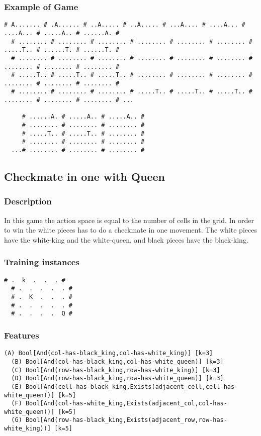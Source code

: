 \documentclass[a4paper]{article}
\begin{document}
\subsubsection{Example of Game}
\begin{Verbatim}[fontsize=\footnotesize]
  # A....... # .A...... # ..A..... # ..A..... # ...A.... # ....A... # ....A... # .....A.. # ......A. #
  # ........ # ........ # ........ # ........ # ........ # ........ # .....T.. # ......T. # ......T. #
  # ........ # ........ # ........ # ........ # ........ # ........ # ........ # ........ # ........ #
  # .....T.. # .....T.. # .....T.. # ........ # ........ # ........ # ........ # ........ # ........ #
  # ........ # ........ # ........ # .....T.. # .....T.. # .....T.. # ........ # ........ # ........ # ...

     # ......A. # .....A.. # .....A.. #
     # ........ # ........ # ........ #
     # .....T.. # .....T.. # ........ #
     # ........ # ........ # ........ #
  ...# ........ # ........ # ........ #

\end{Verbatim}


\subsection{Checkmate in one with Queen}
\subsubsection{Description}
In this game the action space is equal to the number of cells in the grid. In order to win the white pieces has to do a checkmate in one movement. The white pieces have the white-king and the white-queen, and black pieces have the black-king.

\subsubsection{Training instances}
\begin{Verbatim}[fontsize=\footnotesize]
  # .  k  .  .  . #
  # .  .  .  .  . #
  # .  K  .  .  . #
  # .  .  .  .  . #
  # .  .  .  .  Q #
\end{Verbatim}


\subsubsection{Features}
\begin{Verbatim}[fontsize=\footnotesize]
  (A) Bool[And(col-has-black_king,col-has-white_king)] [k=3]
  (B) Bool[And(col-has-black_king,col-has-white_queen)] [k=3]
  (C) Bool[And(row-has-black_king,row-has-white_king)] [k=3]
  (D) Bool[And(row-has-black_king,row-has-white_queen)] [k=3]
  (E) Bool[And(cell-has-black_king,Exists(adjacent_cell,cell-has-white_queen))] [k=5]
  (F) Bool[And(col-has-white_king,Exists(adjacent_col,col-has-white_queen))] [k=5]
  (G) Bool[And(row-has-black_king,Exists(adjacent_row,row-has-white_king))] [k=5]
\end{Verbatim}
\end{document}
